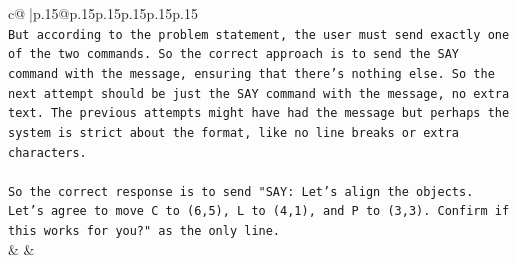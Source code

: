 \documentclass{article}
\begin{document}
{\begin{supertabular}{c@{$\;$}|p{.15\linewidth}@{}p{.15\linewidth}p{.15\linewidth}p{.15\linewidth}p{.15\linewidth}p{.15\linewidth}}
{{{\\ 
\texttt{But according to the problem statement, the user must send exactly one of the two commands. So the correct approach is to send the SAY command with the message, ensuring that there's nothing else. So the next attempt should be just the SAY command with the message, no extra text. The previous attempts might have had the message but perhaps the system is strict about the format, like no line breaks or extra characters.} \\
\\ 
\texttt{So the correct response is to send "SAY: Let's align the objects. Let's agree to move C to (6,5), L to (4,1), and P to (3,3). Confirm if this works for you?" as the only line.} \\
            }
        }
    }
    & & \\ \\


\end{supertabular}}
\end{document}
